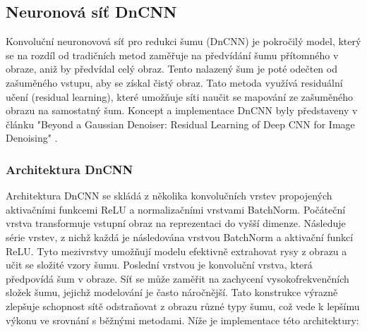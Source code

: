 \documentclass[male,czech,api_ing]{thesis}
\begin{document}
\subsection{Neuronová síť DnCNN}
Konvoluční neuronovová síť pro redukci šumu (DnCNN) je pokročilý model, který se na rozdíl od tradičních metod zaměřuje na předvídání šumu přítomného v obraze, aniž by předvídal celý obraz. Tento nalazený šum je poté odečten od zašuměného vstupu, aby se získal čistý obraz. Tato metoda využívá residuální učení (residual learning), které umožňuje síti naučit se mapování ze zašuměného obrazu na samostatný šum. Koncept a implementace DnCNN byly představeny v článku "Beyond a Gaussian Denoiser: Residual Learning of Deep CNN for Image Denoising" \cite{DnCNN}.

\subsubsection{Architektura DnCNN}
Architektura DnCNN se skládá z několika konvolučních vrstev propojených aktivačními funkcemi ReLU a normalizačními vrstvami BatchNorm. Počáteční vrstva transformuje vstupní obraz na reprezentaci do vyšší dimenze. Následuje série vrstev, z nichž každá je následována vrstvou BatchNorm a aktivační funkcí ReLU. Tyto mezivrstvy umožňují modelu efektivně extrahovat rysy z obrazu a učit se složité vzory šumu. Poslední vrstvou je konvoluční vrstva, která předpovídá šum v obraze. Síť se může zaměřit na zachycení vysokofrekvenčních složek šumu, jejichž modelování je často náročnější. Tato konstrukce výrazně zlepšuje schopnost sítě odstraňovat z obrazu různé typy šumu, což vede k lepšímu výkonu ve srovnání s běžnými metodami. Níže je implementace této architektury:
\end{document}
